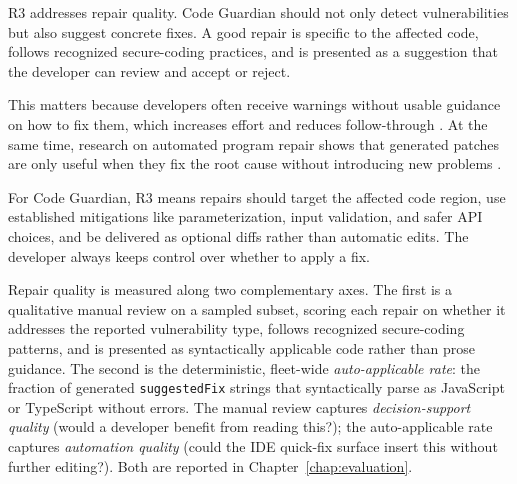 \label{sec:r3-repair-quality}

R3 addresses repair quality. Code Guardian should not only detect vulnerabilities but also suggest concrete fixes. A good repair is specific to the affected code, follows recognized secure-coding practices, and is presented as a suggestion that the developer can review and accept or reject.

This matters because developers often receive warnings without usable guidance on how to fix them, which increases effort and reduces follow-through \cite{johnson2013don,christakis2016developers}. At the same time, research on automated program repair shows that generated patches are only useful when they fix the root cause without introducing new problems \cite{monperrus2014critique}.

For Code Guardian, R3 means repairs should target the affected code region, use established mitigations like parameterization, input validation, and safer API choices, and be delivered as optional diffs rather than automatic edits. The developer always keeps control over whether to apply a fix.

Repair quality is measured along two complementary axes. The first is a qualitative manual review on a sampled subset, scoring each repair on whether it addresses the reported vulnerability type, follows recognized secure-coding patterns, and is presented as syntactically applicable code rather than prose guidance. The second is the deterministic, fleet-wide \emph{auto-applicable rate}: the fraction of generated \texttt{suggestedFix} strings that syntactically parse as JavaScript or TypeScript without errors. The manual review captures \emph{decision-support quality} (would a developer benefit from reading this?); the auto-applicable rate captures \emph{automation quality} (could the IDE quick-fix surface insert this without further editing?). Both are reported in Chapter~\ref{chap:evaluation}.

